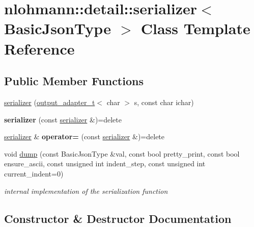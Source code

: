 \hypertarget{classnlohmann_1_1detail_1_1serializer}{}\section{nlohmann\+:\+:detail\+:\+:serializer$<$ Basic\+Json\+Type $>$ Class Template Reference}
\label{classnlohmann_1_1detail_1_1serializer}
\subsection*{Public Member Functions}
\begin{DoxyCompactItemize}
\item 
\mbox{\hyperlink{classnlohmann_1_1detail_1_1serializer_a3076c4514179654cc81d17048439c24a}{serializer}} (\mbox{\hyperlink{namespacenlohmann_1_1detail_a9b680ddfb58f27eb53a67229447fc556}{output\+\_\+adapter\+\_\+t}}$<$ char $>$ s, const char ichar)
\item 
\mbox{\label{classnlohmann_1_1detail_1_1serializer_ae3771351ec4cb892bec707edeb56dc31}} 
{\bfseries serializer} (const \mbox{\hyperlink{classnlohmann_1_1detail_1_1serializer}{serializer}} \&)=delete
\item 
\mbox{\label{classnlohmann_1_1detail_1_1serializer_a5f14c33012477b9f9876dc54d97009a0}} 
\mbox{\hyperlink{classnlohmann_1_1detail_1_1serializer}{serializer}} \& {\bfseries operator=} (const \mbox{\hyperlink{classnlohmann_1_1detail_1_1serializer}{serializer}} \&)=delete
\item 
void \mbox{\hyperlink{classnlohmann_1_1detail_1_1serializer_a95460ebd1a535a543e5a0ec52e00f48b}{dump}} (const Basic\+Json\+Type \&val, const bool pretty\+\_\+print, const bool ensure\+\_\+ascii, const unsigned int indent\+\_\+step, const unsigned int current\+\_\+indent=0)
\begin{DoxyCompactList}\small\item\em internal implementation of the serialization function \end{DoxyCompactList}\end{DoxyCompactItemize}


\subsection{Constructor \& Destructor Documentation}
\mbox{\label{classnlohmann_1_1detail_1_1serializer_a3076c4514179654cc81d17048439c24a}} 
